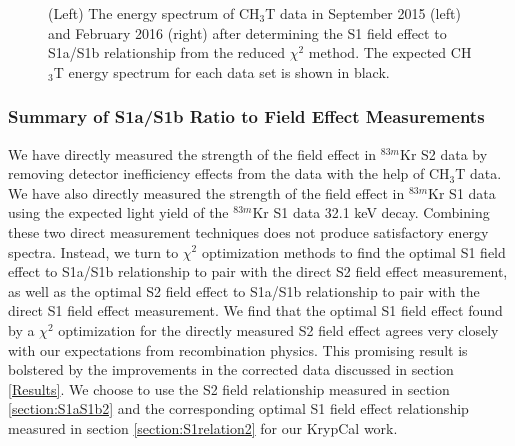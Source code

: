 \documentclass[a4paper,12pt]{article}
\begin{document}
{\begin{figure} [h!]
\centering
{}
\qquad
{}
\caption{ (Left) The energy spectrum of CH$_3$T data in September 2015 (left) and February 2016 (right) after determining the S1 field effect to S1a/S1b relationship from the reduced $\chi^2$ method.  The expected CH$_3$T energy spectrum for each data set is shown in black.}
\label{Kr2p20}
\end{figure}



\subsubsection{Summary of S1a/S1b Ratio to Field Effect Measurements}

We have directly measured the strength of the field effect in $^{83m}$Kr S2 data by removing detector inefficiency effects from the data with the help of CH$_3$T data.  We have also directly measured the strength of the field effect in $^{83m}$Kr S1 data using the expected light yield of the $^{83m}$Kr S1 data 32.1 keV decay.  Combining these two direct measurement techniques does not produce satisfactory energy spectra.  Instead, we turn to $\chi^2$ optimization methods to find the optimal S1 field effect to S1a/S1b relationship to pair with the direct S2 field effect measurement, as well as the optimal S2 field effect to S1a/S1b relationship to pair with the direct S1 field effect measurement.  We find that the optimal S1 field effect found by a $\chi^2$ optimization for the directly measured S2 field effect agrees very closely with our expectations from recombination physics.  This promising result is bolstered by the improvements in the corrected data discussed in section \ref{Results}. We choose to use the S2 field relationship measured in section \ref{section:S1aS1b2} and the corresponding optimal S1 field effect relationship measured in section \ref{section:S1relation2} for our KrypCal work.


}
\end{document}

